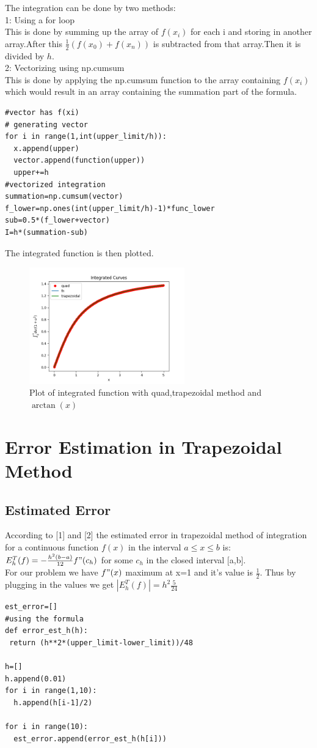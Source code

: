 \documentclass[11pt, a3paper]{article}
\begin{document}
The integration can be done by two methods:\\
1: Using a for loop\\
This is done by summing up the array of $f(x_i)$ for each i and storing in another array.After this $\frac{1}{2}(f(x_0)+f(x_n))$ is subtracted from that array.Then it is divided by $h$.
\\2: Vectorizing using {\selectfont np.cumsum}
\\This is done by applying the {\selectfont np.cumsum} function to the array containing $f(x_i)$ which would result in an array containing the summation part of the formula.
\begin{verbatim}
#vector has f(xi)
# generating vector
for i in range(1,int(upper_limit/h)):
  x.append(upper)
  vector.append(function(upper))
  upper+=h
#vectorized integration
summation=np.cumsum(vector)
f_lower=np.ones(int(upper_limit/h)-1)*func_lower
sub=0.5*(f_lower+vector)
I=h*(summation-sub)
\end{verbatim}
The integrated function is then plotted.
\begin{figure}[h!]
  \includegraphics[width=0.6\textwidth, center]{Fig4.png}
  \caption{Plot of integrated function with  {\selectfont quad},trapezoidal method and $\arctan(x)$}
\end{figure}

\section{Error Estimation in Trapezoidal Method}
\subsection{Estimated Error}
According to [1] and [2] the estimated error in trapezoidal method of integration for a continuous function $f(x)$ in the interval $a \leq x \leq b$ is:\\
$ E_h^T(f)=-\frac{h^2(b-a)}{12}f"(c_h)$ for some $c_h$ in the closed interval [a,b].
\\For our problem we have $f"(x) $ maximum at x=1 and it's value is $\frac{1}{2}$.
Thus by plugging in the values we get $|E_h^T(f)|=h^2\frac{5}{24}$
\begin{verbatim}
est_error=[]
#using the formula
def error_est_h(h):
 return (h**2*(upper_limit-lower_limit))/48
    
h=[]
h.append(0.01)
for i in range(1,10):
  h.append(h[i-1]/2)
    
for i in range(10):
  est_error.append(error_est_h(h[i]))
    \end{verbatim}
\end{document}
